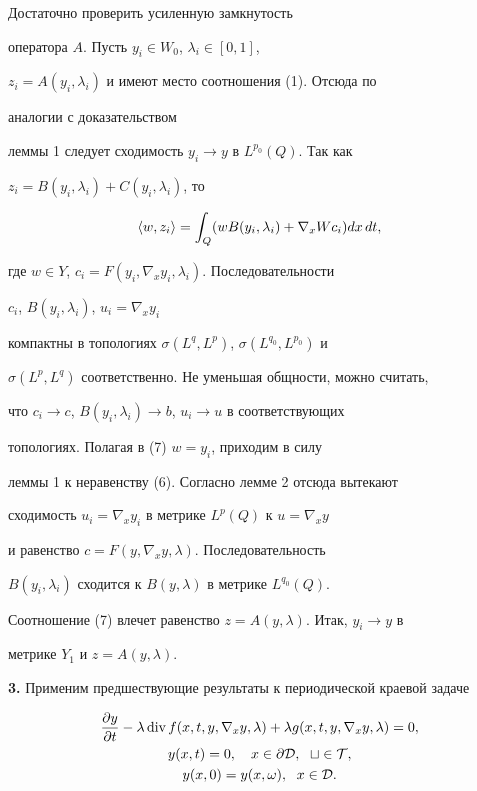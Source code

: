 \begin{pf} 


Достаточно проверить усиленную замкнутость 


оператора $A$. Пусть $y_i\in W_0$, $\lambda_i\in[0,1]$, 


$z_i=A(y_i,\lambda_i)$ и имеют место соотношения (1). Отсюда по 


аналогии с доказательством 


леммы 1 следует сходимость $y_i\to y$ в $L^{p_0}(Q)$. Так как 


$z_i=B(y_i,\lambda_i)+C(y_i,\lambda_i)$, то 


\begin{equation} 


\la w,z_i\ra=\int_Q(w B(y_i,\lambda_i)+\nabla_x W c_i)d x\,d t, 


\end{equation} 


где $w\in Y$, $c_i=F(y_i,\nabla_x y_i,\lambda_i)$. Последовательности 


$c_i$, $B(y_i,\lambda_i)$, $u_i=\nabla_x y_i$ 


компактны в топологиях $\sigma(L^q,L^p)$, $\sigma(L^{q_0},L^{p_0})$ и 


$\sigma(L^p,L^q)$ соответственно. Не уменьшая общности, можно считать, 


что $c_i\to c$, $B(y_i,\lambda_i)\to b$, $u_i\to u$ в соответствующих 


топологиях. Полагая в (7) $w=y_i$, приходим в силу 


леммы 1 к неравенству (6). Согласно лемме 2 отсюда вытекают 


сходимость $u_i=\nabla_x y_i$ в метрике $L^p(Q)$ к $u=\nabla_x y$ 


и равенство $c=F(y,\nabla_x y,\lambda)$. Последовательность 


$B(y_i,\lambda_i)$ сходится к $B(y,\lambda)$ в метрике $L^{q_0}(Q)$. 


Соотношение (7) влечет равенство $z=A(y,\lambda)$. Итак, $y_i\to y$ в 


метрике $Y_1$ и $z=A(y,\lambda)$. 


\end{pf} 


 


{\bf 3.} Применим предшествующие результаты к периодической краевой задаче 


\begin{gather} 


\frac{\partial y}{\partial t}-\lambda\Div f(x,t,y,\nabla_x y,\lambda) 


+\lambda g(x,t,y,\nabla_x y,\lambda)=0,\\ 


% 


y(x,t)=0,\quad x\in\partial\cal D,\ \; t\in T, \\ 


% 


y(x,0)=y(x,\omega),\ \; x\in \cal D. 


\end{gather} 


